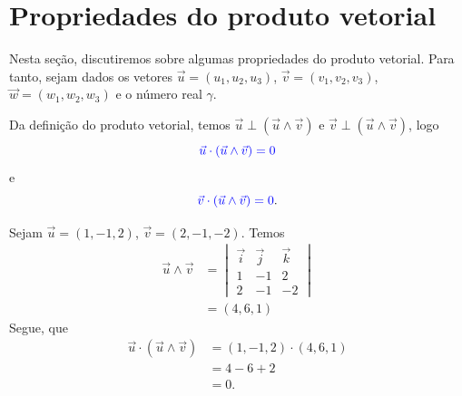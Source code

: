 \section{Propriedades do produto vetorial}\label{cap_prodvet_sec_prop}

Nesta seção, discutiremos sobre algumas propriedades do produto vetorial. Para tanto, sejam dados os vetores $\vec{u} = (u_1,u_2,u_3)$, $\vec{v}=(v_1,v_2,v_3)$, $\vec{w}=(w_1,w_2,w_3)$ e o número real $\gamma$.

Da definição do produto vetorial, temos $\vec{u}\perp(\vec{u}\land\vec{v})$ e $\vec{v}\perp(\vec{u}\land\vec{v})$, logo
\begin{equation}
  {\color{blue}\vec{u}\cdot(\vec{u}\land\vec{v}) = 0}
\end{equation}
e
\begin{equation}
  {\color{blue}\vec{v}\cdot(\vec{u}\land\vec{v}) = 0}.
\end{equation}

\begin{ex}
  Sejam $\vec{u}=(1,-1,2)$, $\vec{v}=(2,-1,-2)$. Temos
  \begin{align}
    \vec{u}\land\vec{v} &=
    \begin{vmatrix}
      \vec{i} & \vec{j} & \vec{k} \\
      1 & -1 & 2 \\
      2 & -1 & -2
    \end{vmatrix}\\
              &= (4,6,1)
  \end{align}
  Segue, que
  \begin{align}
    \vec{u}\cdot(\vec{u}\land\vec{v}) &= (1,-1,2)\cdot (4,6,1) \\
                                      &= 4-6+2\\
                                      &= 0.
  \end{align}
\end{ex}

